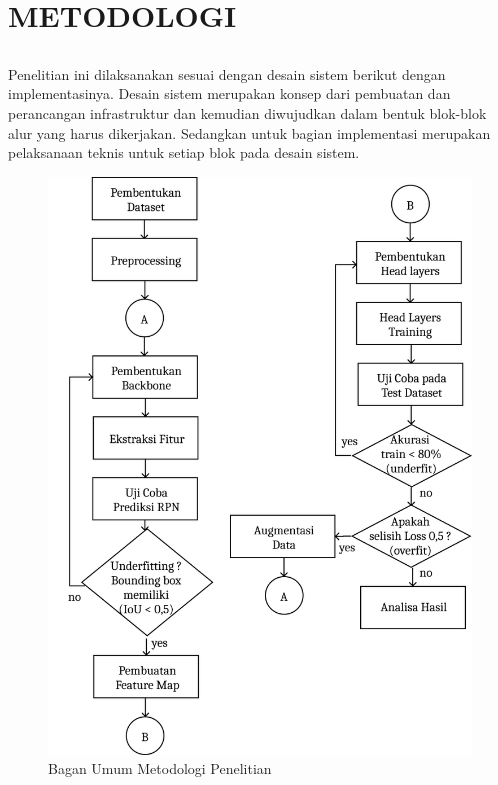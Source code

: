 \chapter{METODOLOGI}
\label{sec:chap3_metodologi}

\section*{ }
Penelitian ini dilaksanakan sesuai dengan desain sistem berikut dengan implementasinya. 
Desain sistem merupakan konsep dari pembuatan dan perancangan infrastruktur dan kemudian diwujudkan dalam 
bentuk blok-blok alur yang harus dikerjakan. Sedangkan untuk bagian implementasi merupakan pelaksanaan teknis 
untuk setiap blok pada desain sistem.

\begin{figure}[h!]
	\begin{center}
	  \includegraphics[width= 0.8\linewidth]{bab3/Flow Chart.png}
	  \caption{Bagan Umum Metodologi Penelitian}
	  \label{fig: base_method_1}
	\end{center}
\end{figure}


